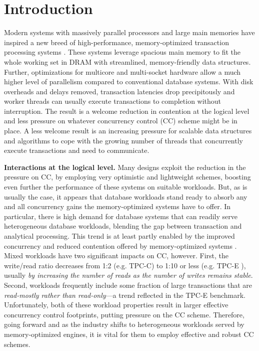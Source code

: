 
\section{Introduction}

Modern systems with massively parallel processors and large main memories have inspired a new breed of high-performance, memory-optimized transaction processing systems \cite{Kallman+08,PandisJHA10,KemperN11,LarsonBDFPZ11,LevandoskiLSSW15,TuZKLM13}. These systems leverage spacious main memory to fit the whole working set in DRAM with streamlined, memory-friendly data structures. Further, optimizations for multicore and multi-socket hardware allow a much higher level of parallelism compared to conventional database systems. With disk overheads and delays removed, transaction latencies drop precipitously and worker threads can usually execute transactions to completion without interruption. The result is a welcome reduction in contention at the logical level and less pressure on whatever concurrency control (CC) scheme might be in place. A less welcome result is an increasing pressure for scalable data structures and algorithms to cope with the growing number of threads that concurrently execute transactions and need to communicate.


\vspace{2mm}
{\bf Interactions at the logical level.} 
Many designs exploit the reduction in the pressure on CC, by employing very optimistic and lightweight schemes, boosting even further the performance of these systems on suitable workloads.
But, as is usually the case, it appears that database workloads stand ready to absorb any and all concurrency gains the memory-optimized systems have to offer. In particular, there is high demand for database systems that can readily serve heterogeneous database workloads, blending the gap between transaction and analytical processing. This trend is at least partly enabled by the improved concurrency and reduced contention offered by memory-optimized systems \cite{Farber+12}. Mixed workloads have two significant impacts on CC, however. First, the write/read ratio decreases from 1:2 (e.g. TPC-C) to 1:10 or less (e.g. TPC-E \cite{Chen+10,TozunPKJA13}), usually {\it by increasing the number of reads as the number of writes remains stable}.
Second, workloads frequently include some fraction of large transactions that are {\it read-mostly rather than read-only}---a trend reflected in the TPC-E benchmark. Unfortunately, both of these workload properties result in larger effective concurrency control footprints, putting pressure on the CC scheme. 
Therefore, going forward and as the industry shifts to heterogeneous workloads served by memory-optimized engines, it is vital for them to employ effective and robust CC schemes. 


